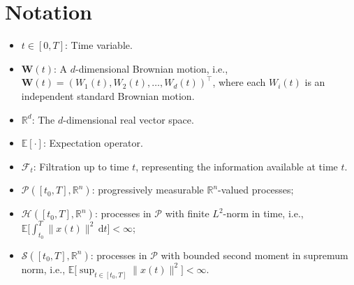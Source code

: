 \section*{Notation}

\begin{itemize}
  \item \( t \in [0,T] \): Time variable.
  \item \( \bm{W}(t) \): A \( d \)-dimensional Brownian motion, i.e., \( \bm{W}(t) = (W_1(t), W_2(t), \dots, W_d(t))^\top \), where each \( W_i(t) \) is an independent standard Brownian motion.
  \item \( \mathbb{R}^d \): The \( d \)-dimensional real vector space.
  \item \( \mathbb{E}[\cdot] \): Expectation operator.
  \item \( \mathcal{F}_t \): Filtration up to time \( t \), representing the information available at time \( t \).
  \item $\mathcal{P}([t_0, T], \mathbb{R}^n)$: progressively measurable $\mathbb{R}^n$-valued processes;
  \item $\mathcal{H}([t_0, T], \mathbb{R}^n)$: processes in $\mathcal{P}$ with finite $L^2$-norm in time, i.e., $\mathbb{E}\big[ \int_{t_0}^T \|x(t)\|^2 \, \mathrm{d}t \big] < \infty$;
  \item $\mathcal{S}([t_0, T], \mathbb{R}^n)$: processes in $\mathcal{P}$ with bounded second moment in supremum norm, i.e., $\mathbb{E}\big[ \sup_{t \in [t_0, T]} \|x(t)\|^2 \big] < \infty$.
\end{itemize}